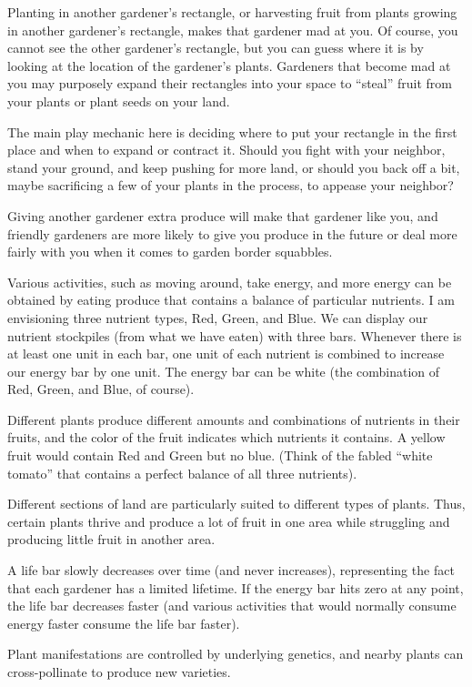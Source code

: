 \documentclass[12pt]{article}
\begin{document}
Planting in another gardener's rectangle, or harvesting fruit from plants growing in another gardener's rectangle, makes that gardener mad at you.
Of course, you cannot see the other gardener's rectangle, but you can guess where it is by looking at the location of the gardener's plants.
Gardeners that become mad at you may purposely expand their rectangles into your space to ``steal'' fruit from your plants or plant seeds on your land.

The main play mechanic here is deciding where to put your rectangle in the first place and when to expand or contract it.
Should you fight with your neighbor, stand your ground, and keep pushing for more land, or should you back off a bit, maybe sacrificing a few of your plants in the process, to appease your neighbor?

Giving another gardener extra produce will make that gardener like you, and friendly gardeners are more likely to give you produce in the future or deal more fairly with you when it comes to garden border squabbles. 

Various activities, such as moving around, take energy, and more energy can be obtained by eating produce that contains a balance of particular nutrients.
I am envisioning three nutrient types, Red, Green, and Blue.
We can display our nutrient stockpiles (from what we have eaten) with three bars.
Whenever there is at least one unit in each bar, one unit of each nutrient is combined to increase our energy bar by one unit.
The energy bar can be white (the combination of Red, Green, and Blue, of course).

Different plants produce different amounts and combinations of nutrients in their fruits, and the color of the fruit indicates which nutrients it contains.
A yellow fruit would contain Red and Green but no blue.  (Think of the fabled ``white tomato'' that contains a perfect balance of all three nutrients).

Different sections of land are particularly suited to different types of plants.
Thus, certain plants thrive and produce a lot of fruit in one area while struggling and producing little fruit in another area.

A life bar slowly decreases over time (and never increases), representing the fact that each gardener has a limited lifetime.
If the energy bar hits zero at any point, the life bar decreases faster (and various activities that would normally consume energy faster consume the life bar faster).

Plant manifestations are controlled by underlying genetics, and nearby plants can cross-pollinate to produce new varieties.
\end{document}
